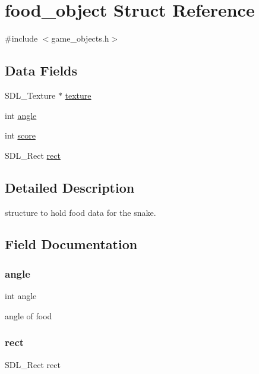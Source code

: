 \hypertarget{structfood__object}{}\section{food\+\_\+object Struct Reference}
\label{structfood__object}


{\ttfamily \#include $<$game\+\_\+objects.\+h$>$}

\subsection*{Data Fields}
\begin{DoxyCompactItemize}
\item 
S\+D\+L\+\_\+\+Texture $\ast$ \mbox{\hyperlink{structfood__object_a859b8efbf9abe8e82757ee5c75a0c97c}{texture}}
\item 
int \mbox{\hyperlink{structfood__object_a63177970cacb40efba67ce501ea89210}{angle}}
\item 
int \mbox{\hyperlink{structfood__object_aef160b7437d94056f1dc59646cd5b87d}{score}}
\item 
S\+D\+L\+\_\+\+Rect \mbox{\hyperlink{structfood__object_a55aefd071649ac9dd8133e2d8a52d11f}{rect}}
\end{DoxyCompactItemize}


\subsection{Detailed Description}
structure to hold food data for the snake. 

\subsection{Field Documentation}
\mbox{\label{structfood__object_a63177970cacb40efba67ce501ea89210}} 
\subsubsection{\texorpdfstring{angle}{angle}}
{\footnotesize\ttfamily int angle}

angle of food \mbox{\label{structfood__object_a55aefd071649ac9dd8133e2d8a52d11f}} 
\subsubsection{\texorpdfstring{rect}{rect}}
{\footnotesize\ttfamily S\+D\+L\+\_\+\+Rect rect}

